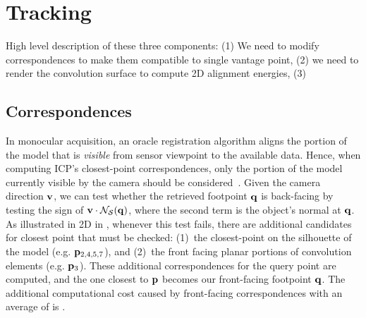 \section{Tracking}
\begin{DRAFT}
High level description of these three components:
(1) We need to modify correspondences to make them compatible to single vantage point, 
(2) we need to render the convolution surface to compute 2D alignment energies, 
(3)
\end{DRAFT}


\subsection{Correspondences}
In monocular acquisition, an oracle registration algorithm aligns the portion of the model that is \emph{visible} from sensor viewpoint to the available data. Hence, when computing ICP's closest-point correspondences, only the portion of the model currently visible by the camera should be considered~\cite{tagliasacchi2015robust}. Given the camera direction $\mathbf{v}$, we can test whether the retrieved footpoint $\mathbf{q}$ is back-facing by testing the sign of $\mathbf{v} \cdot \mathcal{N}_{\mathcal{S}}(\mathbf{q})$, where the second term is the object's normal at $\mathbf{q}$. As illustrated in 2D in , whenever this test fails, there are additional candidates for closest point that must be checked: (1)~the closest-point on the silhouette of the model (e.g. $\mathbf{p}_{2,4,5,7}$), and (2)~the front facing planar portions of convolution elements (e.g. $\mathbf{p}_{3}$). These additional correspondences for the query point are computed, and the one closest to $\mathbf{p}$ becomes our front-facing footpoint $\mathbf{q}$. The additional computational cost caused by front-facing correspondences with an average of  is .



